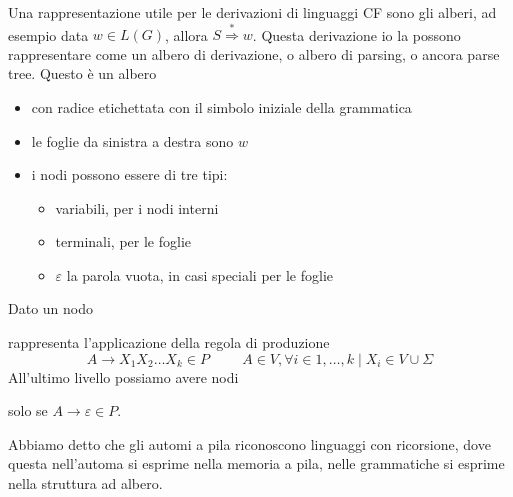 \documentclass[12pt]{report}
\theoremstyle{definition}
\theoremstyle{regard}
\begin{document}
Una rappresentazione utile per le derivazioni di linguaggi CF sono gli alberi, ad esempio data $w \in L(G)$, allora $S \overset{*}{\Rightarrow} w$.
Questa derivazione io la possono rappresentare come un albero di derivazione, o albero di parsing, o ancora parse tree.
Questo è un albero 
\begin{itemize}
	\item con radice etichettata con il simbolo iniziale della grammatica
	\item le foglie da sinistra a destra sono $w$
	\item i nodi possono essere di tre tipi:
		\begin{itemize}
			\item variabili, per i nodi interni
			\item terminali, per le foglie
			\item $\varepsilon$ la parola vuota, in casi speciali per le foglie
		\end{itemize}
\end{itemize}
Dato un nodo
\begin{center}
\end{center}
rappresenta l'applicazione della regola di produzione
$$ A \rightarrow X_1 X_2 \dots X_k \in P \hspace{1cm} A \in V, \forall i \in 1, \dots, k \mid X_i \in V \cup \Sigma $$
All'ultimo livello possiamo avere nodi
\begin{center}
\end{center}
solo se $A \rightarrow \varepsilon \in P$.

Abbiamo detto che gli automi a pila riconoscono linguaggi con ricorsione, dove questa nell'automa si esprime nella memoria a pila, nelle grammatiche si esprime nella struttura ad albero.
 
\end{document}
